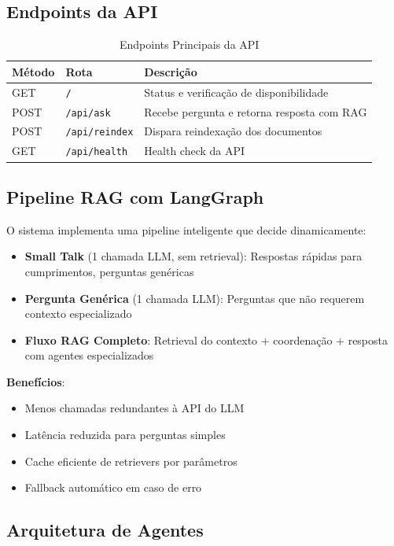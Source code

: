 \documentclass[12pt,a4paper]{report}
\begin{document}
\subsection{Endpoints da API}

\begin{table}[H]
\centering
\caption{Endpoints Principais da API}
\begin{tabular}{|l|l|p{4cm}|}
\hline
\textbf{Método} & \textbf{Rota} & \textbf{Descrição} \\
\hline
GET & \texttt{/} & Status e verificação de disponibilidade \\
\hline
POST & \texttt{/api/ask} & Recebe pergunta e retorna resposta com RAG \\
\hline
POST & \texttt{/api/reindex} & Dispara reindexação dos documentos \\
\hline
GET & \texttt{/api/health} & Health check da API \\
\hline
\end{tabular}
\end{table}

\subsection{Pipeline RAG com LangGraph}

O sistema implementa uma pipeline inteligente que decide dinamicamente:

\begin{itemize}
  \item \textbf{Small Talk} (1 chamada LLM, sem retrieval): Respostas rápidas para cumprimentos, perguntas genéricas
  \item \textbf{Pergunta Genérica} (1 chamada LLM): Perguntas que não requerem contexto especializado
  \item \textbf{Fluxo RAG Completo}: Retrieval do contexto + coordenação + resposta com agentes especializados
\end{itemize}

\textbf{Benefícios}:
\begin{itemize}
  \item Menos chamadas redundantes à API do LLM
  \item Latência reduzida para perguntas simples
  \item Cache eficiente de retrievers por parâmetros
  \item Fallback automático em caso de erro
\end{itemize}

\subsection{Arquitetura de Agentes}
\end{document}
